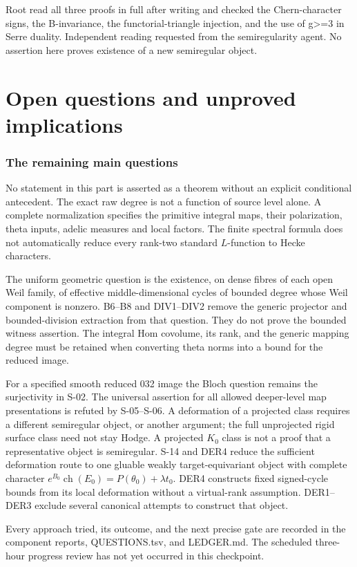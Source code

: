 \documentclass[11pt,a4paper]{article}
\theoremstyle{definition}
\begin{document}
Root read all three proofs in full after writing and checked the
Chern-character signs, the B-invariance, the functorial-triangle
injection, and the use of g\textgreater=3 in Serre duality. Independent
reading requested from the semiregularity agent. No assertion here
proves existence of a new semiregular object.

\clearpage
\part{Open questions and unproved implications}
\section{The remaining main questions}
No statement in this part is asserted as a theorem without an explicit
conditional antecedent. The exact raw degree is not a function of source
level alone. A complete normalization specifies the primitive integral
maps, their polarization, theta inputs, adelic measures and local factors.
The finite spectral formula does not automatically reduce every rank-two
standard $L$-function to Hecke characters.

The uniform geometric question is the existence, on dense fibres of each
open Weil family, of effective middle-dimensional cycles of bounded degree
whose Weil component is nonzero. B6--B8 and DIV1--DIV2 remove the generic
projector and bounded-division extraction from that question. They do not
prove the bounded witness assertion. The integral Hom covolume, its rank,
and the generic mapping degree must be retained when converting theta
norms into a bound for the reduced image.

For a specified smooth reduced 032 image the Bloch question remains the
surjectivity in S-02. The universal assertion for all allowed deeper-level
map presentations is refuted by S-05--S-06. A deformation of a projected
class requires a different semiregular object, or another argument; the
full unprojected rigid surface class need not stay Hodge. A projected
$K_0$ class is not a proof that a representative object is semiregular.
S-14 and DER4 reduce the sufficient deformation route to one gluable
weakly target-equivariant object with complete character
$e^{B_0}\operatorname{ch}(E_0)=P(\theta_0)+\lambda t_0$.
DER4 constructs fixed signed-cycle bounds from its local deformation
without a virtual-rank assumption. DER1--DER3 exclude several canonical
attempts to construct that object.

Every approach tried, its outcome, and the next precise gate are recorded
in the component reports, QUESTIONS.tsv, and LEDGER.md. The scheduled
three-hour progress review has not yet occurred in this checkpoint.
\end{document}
